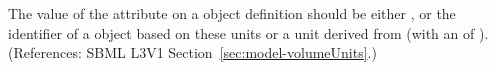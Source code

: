 The value of the  attribute on a \Model object
definition should be either ,  or the
identifier of a \UnitDefinition object based on these units or a unit
derived from  (with an  of ).
(References: SBML L3V1 Section~\ref{sec:model-volumeUnits}.)
